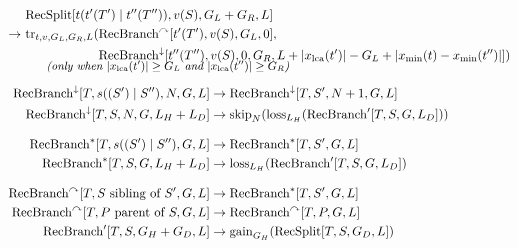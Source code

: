 {\begin{subequations}
\begin{align}
\begin{aligned}
    \end{aligned} \span \label{eq:adp-rec:comb-grammar-dup} \\[1ex]
    \begin{aligned}
        &\gRecSplit[t(t'(T') \mid t''(T'')), v(S), G_L + G_R, L] \\
        \rightarrow\ & \evTr_{t,v,G_L,G_R,L}(
            \begin{aligned}[t]
                &\gRecOutBranch[t'(T'), v(S), G_L, 0], \\
                &\gRecPathBranch[t''(T''), v(S), 0, G_R, L + |\xlca(t')| - G_L + |\xmin(t) - \xmin(t'')|])
            \end{aligned} \\[-2ex]
        \intertext{\hspace*{3em}\itshape\small (only when \(|\xlca(t')| \ge G_L\) and \(|\xlca(t'')| \ge G_R\))}
    \end{aligned} \span \label{eq:adp-rec:comb-grammar-tr} \\[1ex]
    \gRecPathBranch[T, s((S') \mid S''), N, G, L]
        &\rightarrow \gRecPathBranch[T, S', N+1, G, L] \label{eq:adp-rec:comb-grammar-path-down} \\
    \gRecPathBranch[T, S, N, G, L_H + L_D]
        &\rightarrow \evSkip_N(\evLoss_{L_H}(\gRecBranchEnd[T, S, G, L_D])) \label{eq:adp-rec:comb-grammar-path-end} \\[2ex]
    \gRecInBranch[T, s((S') \mid S''), G, L] &\rightarrow \gRecInBranch[T, S', G, L] \label{eq:adp-rec:comb-grammar-in-down} \\
    \gRecInBranch[T, S, G, L_H + L_D] &\rightarrow \evLoss_{L_H}(\gRecBranchEnd[T, S, G, L_D]) \label{eq:adp-rec:comb-grammar-in-end} \\[2ex]
    \gRecOutBranch[T, S \text{ sibling of } S', G, L] &\rightarrow \gRecInBranch[T, S', G, L] \label{eq:adp-rec:comb-grammar-out-side} \\
    \gRecOutBranch[T, P \text{ parent of } S, G, L] &\rightarrow \gRecOutBranch[T, P, G, L] \label{eq:adp-rec:comb-grammar-out-up} \\
    \gRecBranchEnd[T, S, G_H + G_D, L] &\rightarrow \evGain_{G_H}(\gRecSplit[T, S, G_D, L]) \label{eq:adp-rec:comb-grammar-gain}
\end{align}
\end{subequations}}

